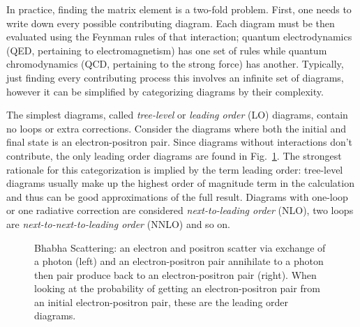 In practice, finding the matrix element is a two-fold problem. First, one needs to write down every possible contributing diagram. Each diagram must be then evaluated using the Feynman rules of that interaction; quantum electrodynamics (QED, pertaining to electromagnetism) has one set of rules while quantum chromodynamics (QCD, pertaining to the strong force) has another. Typically, just finding every contributing process this involves an infinite set of diagrams, however it can be simplified by categorizing diagrams by their complexity.

The simplest diagrams, called \textit{tree-level} or \textit{leading order} (LO) diagrams, contain no loops or extra corrections. Consider the diagrams where both the initial and final state is an electron-positron pair. Since diagrams without interactions don't contribute, the only leading order diagrams are found in Fig.~\ref{fig:Bhabha}. The strongest rationale for this categorization is implied by the term leading order: tree-level diagrams usually make up the highest order of magnitude term in the calculation and thus can be good approximations of the full result. Diagrams with one-loop or one radiative correction are considered \textit{next-to-leading order} (NLO), two loops are \textit{next-to-next-to-leading order} (NNLO) and so on.

\begin{figure}
\begin{center}
\unitlength=1mm
\end{center}
\caption[Feynman Diagrams of Bhabha Scattering]{Bhabha Scattering: an electron and positron scatter via exchange of a photon (left) and an electron-positron pair annihilate to a photon then pair produce back to an electron-positron pair (right). When looking at the probability of getting an electron-positron pair from an initial electron-positron pair, these are the leading order diagrams.}
\label{fig:Bhabha}
\end{figure}

